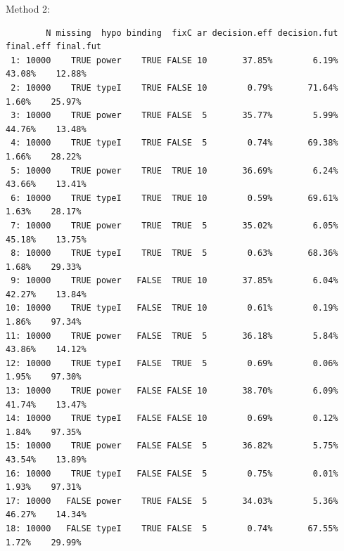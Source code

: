 \documentclass[12pt]{article}
\begin{document}
Method 2:
\begin{verbatim}
        N missing  hypo binding  fixC ar decision.eff decision.fut final.eff final.fut
 1: 10000    TRUE power    TRUE FALSE 10       37.85%        6.19%    43.08%    12.88%
 2: 10000    TRUE typeI    TRUE FALSE 10        0.79%       71.64%     1.60%    25.97%
 3: 10000    TRUE power    TRUE FALSE  5       35.77%        5.99%    44.76%    13.48%
 4: 10000    TRUE typeI    TRUE FALSE  5        0.74%       69.38%     1.66%    28.22%
 5: 10000    TRUE power    TRUE  TRUE 10       36.69%        6.24%    43.66%    13.41%
 6: 10000    TRUE typeI    TRUE  TRUE 10        0.59%       69.61%     1.63%    28.17%
 7: 10000    TRUE power    TRUE  TRUE  5       35.02%        6.05%    45.18%    13.75%
 8: 10000    TRUE typeI    TRUE  TRUE  5        0.63%       68.36%     1.68%    29.33%
 9: 10000    TRUE power   FALSE  TRUE 10       37.85%        6.04%    42.27%    13.84%
10: 10000    TRUE typeI   FALSE  TRUE 10        0.61%        0.19%     1.86%    97.34%
11: 10000    TRUE power   FALSE  TRUE  5       36.18%        5.84%    43.86%    14.12%
12: 10000    TRUE typeI   FALSE  TRUE  5        0.69%        0.06%     1.95%    97.30%
13: 10000    TRUE power   FALSE FALSE 10       38.70%        6.09%    41.74%    13.47%
14: 10000    TRUE typeI   FALSE FALSE 10        0.69%        0.12%     1.84%    97.35%
15: 10000    TRUE power   FALSE FALSE  5       36.82%        5.75%    43.54%    13.89%
16: 10000    TRUE typeI   FALSE FALSE  5        0.75%        0.01%     1.93%    97.31%
17: 10000   FALSE power    TRUE FALSE  5       34.03%        5.36%    46.27%    14.34%
18: 10000   FALSE typeI    TRUE FALSE  5        0.74%       67.55%     1.72%    29.99%
\end{verbatim}
\end{document}
